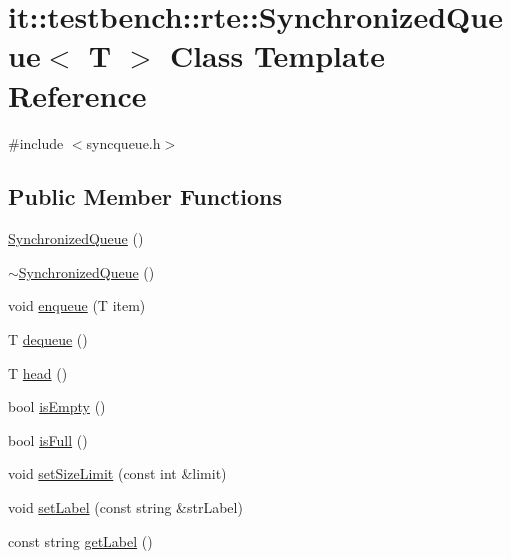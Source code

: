\hypertarget{classit_1_1testbench_1_1rte_1_1SynchronizedQueue}{\section{it\-:\-:testbench\-:\-:rte\-:\-:Synchronized\-Queue$<$ T $>$ Class Template Reference}
\label{d6/dec/classit_1_1testbench_1_1rte_1_1SynchronizedQueue}
}


{\ttfamily \#include $<$syncqueue.\-h$>$}

\subsection*{Public Member Functions}
\begin{DoxyCompactItemize}
\item 
\hyperlink{classit_1_1testbench_1_1rte_1_1SynchronizedQueue_a01db3f3d535459846e0fd8030229490a}{Synchronized\-Queue} ()
\item 
\hyperlink{classit_1_1testbench_1_1rte_1_1SynchronizedQueue_ab368a462c83410b606f9b391f5eac539}{$\sim$\-Synchronized\-Queue} ()
\item 
void \hyperlink{classit_1_1testbench_1_1rte_1_1SynchronizedQueue_af90cc63f643134be8955803534868ea4}{enqueue} (T item)
\item 
T \hyperlink{classit_1_1testbench_1_1rte_1_1SynchronizedQueue_a3cdc1ea4ec0dc12d946c1b711212ef6d}{dequeue} ()
\item 
T \hyperlink{classit_1_1testbench_1_1rte_1_1SynchronizedQueue_a10442061ffe74b4d191c24a98f95eed6}{head} ()
\item 
bool \hyperlink{classit_1_1testbench_1_1rte_1_1SynchronizedQueue_ad0bcfc252a1c515cc9fb5befbd95e40a}{is\-Empty} ()
\item 
bool \hyperlink{classit_1_1testbench_1_1rte_1_1SynchronizedQueue_ad57d334f2d5032447fdc015e2c1e2488}{is\-Full} ()
\item 
void \hyperlink{classit_1_1testbench_1_1rte_1_1SynchronizedQueue_a9634efeb8162b84cbbbb3aae4e2217f8}{set\-Size\-Limit} (const int \&limit)
\item 
void \hyperlink{classit_1_1testbench_1_1rte_1_1SynchronizedQueue_a12ec0e399d02a1deea708a2354852aad}{set\-Label} (const string \&str\-Label)
\item 
const string \hyperlink{classit_1_1testbench_1_1rte_1_1SynchronizedQueue_ad2abef5d5fbf8b13584bc8f4ce71416b}{get\-Label} ()
\end{DoxyCompactItemize}
